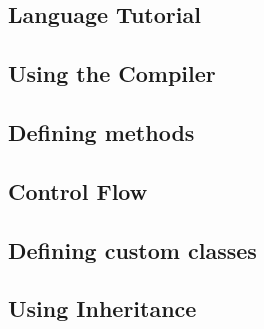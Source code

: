 \begin{homeworkProblem}
	\chapter{Language Tutorial}
	\section{Using the Compiler}
	\section{Defining methods}
	\section{Control Flow}
	\section{Defining custom classes}
	\section{Using Inheritance}
\end{homeworkProblem}